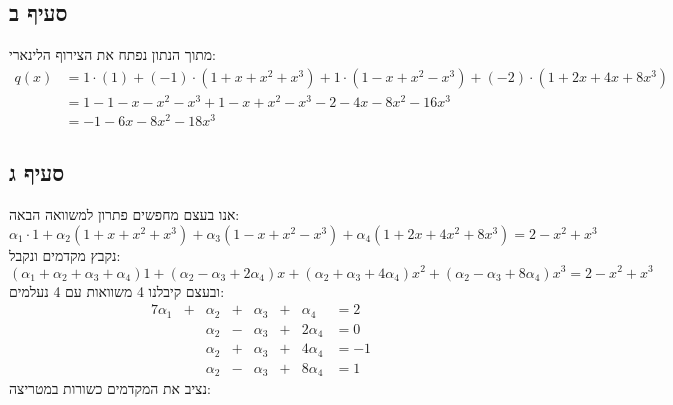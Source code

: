 \documentclass{article}
\begin{document}
	\subsection*{סעיף ב}
	מתוך הנתון נפתח את הצירוף הלינארי:
	\begin{align*}
		q(x) &= 1 \cdot (1) + (-1) \cdot (1 + x + x^2 + x^3) + 1 \cdot (1 - x + x^2 - x^3) + (-2) \cdot (1 + 2x + 4x + 8x^3)  \\
		&= 1 - 1 - x - x^2 - x^3 + 1 - x + x^2 - x^3 - 2 - 4x -8x^2 - 16x^3 \\
		&= - 1 - 6x - 8x^2 - 18x^3
	\end{align*}

	\subsection*{סעיף ג}
	אנו בעצם מחפשים פתרון למשוואה הבאה:
	\[
	\alpha_1 \cdot 1 + \alpha_2 (1 + x + x^2 + x^3) + \alpha_3 (1 - x + x^2 - x^3) + \alpha_4(1 + 2x + 4x^2 + 8x^3) =
	2 - x^2 + x^3
	\]
	נקבץ מקדמים ונקבל:
	\[
	(\alpha_1 + \alpha_2 + \alpha_3 + \alpha_4)1 + (\alpha_2 - \alpha_3 + 2\alpha_4)x
	+ (\alpha_2 + \alpha_3 + 4\alpha_4)x^2 + (\alpha_2 - \alpha_3 + 8\alpha_4)x^3
	= 2 - x^2 + x^3
	\]
	ובעצם קיבלנו 4 משוואות עם 4 נעלמים:
	\begin{alignat}{7}
		\alpha_1 & + & \alpha_2 & + & \alpha_3 & + & \alpha_4 &= 2 \\
		&& \alpha_2 & - & \alpha_3 & + & 2\alpha_4 &= 0 \\
		&& \alpha_2 & + & \alpha_3 & + & 4\alpha_4 &= -1 \\
		&& \alpha_2 & - & \alpha_3 & + & 8\alpha_4 &= 1
	\end{alignat}
	נציב את המקדמים כשורות במטריצה:
\end{document}
